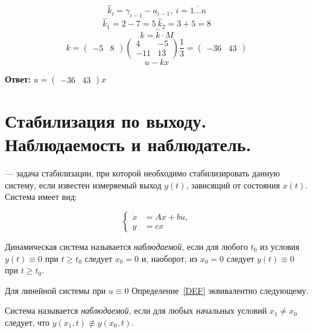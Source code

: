 \documentclass[../../TAU.tex]{subfiles}
\begin{document}
    $$
        \widehat k_i=\gamma    _{i-1}-a_{i-1},\ i=\overline{1\dots n}
    $$
    $$
        \widehat k_1 = 2-7=5\ \widehat k_2 =3+5=8
    $$
    $$
        k=\widehat k\cdot M
    $$
    $$
        k=
        \begin{pmatrix}
        -5 & 8
        \end{pmatrix}
        \begin{pmatrix}
            4 & -5\\
            -11 & 13
        \end{pmatrix}
        \frac{1}{3}
        =
        \begin{pmatrix}
            -36 & 43
        \end{pmatrix}
    $$
    $$
        u -kx
    $$

    \textbf{Ответ: }
    $
        u=
        \begin{pmatrix}
            -36 & 43
        \end{pmatrix}
        x
    $

\section{Стабилизация по выходу. Наблюдаемость и наблюдатель.}

     --- задача стабилизации, при которой необходимо стабилизировать данную систему, если известен измеряемый выход $y(t)$, зависящий от состояния $x(t)$. Система имеет вид:

    \begin{equation}\label{DS}
        \left\{
        \begin{aligned}
            \dot x &= Ax + bu,\\
            y &= c x
        \end{aligned}
        \right.
    \end{equation}

    \begin{defi}\label{DEF}
        Динамическая система  называется \textit{наблюдаемой}, если для любого $t_0$ из условия $y(t)\equiv 0$ при $t\ge t_0$ следует $x_0 = 0$ и, наоборот, из $x_0=0$ следует $y(t)\equiv0$ при $t\ge t_0$.
    \end{defi}

    Для линейной системы  при $u\equiv0$ Определение~\ref{DEF} эквивалентно следующему.
    
    \begin{defi}
        Система  называется \textit{наблюдаемой}, если для любых начальных условий $x_1\neq x_0$ следует, что $y(x_1, t)\not\equiv y(x_0, t)$.
    \end{defi}
\end{document}
